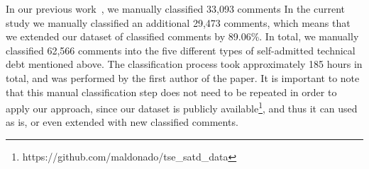 In our previous work~\cite{Maldonado2015MTD}, we manually classified 33,093 comments In the current study we manually classified an additional 29,473 comments, which means that we extended our dataset of classified comments by 89.06\%. In total, we manually classified 62,566 comments into the five different types of self-admitted technical debt mentioned above. The classification process took approximately 185 hours in total, and was performed by the first author of the paper. It is important to note that this manual classification step does not need to be repeated in order to apply our approach, since our dataset is publicly available\footnote{https://github.com/maldonado/tse\_satd\_data}, and thus it can used as is, or even extended with new classified comments. 

